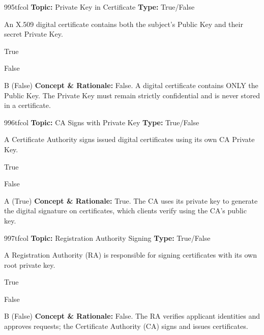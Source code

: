 \begin{qcard}{995}{tfcol}
\textcolor{darkslate!75}{\small\textbf{Topic:} Private Key in Certificate \hfill \textbf{Type:} True/False}\vspace{0.4em}\par
An X.509 digital certificate contains both the subject's Public Key and their secret Private Key.
\begin{qoptions}
\item True
\item False
\end{qoptions}
\end{qcard}
\nopagebreak
\begin{explainbox}{B (False)}
\textbf{Concept \& Rationale:} False. A digital certificate contains ONLY the Public Key. The Private Key must remain strictly confidential and is never stored in a certificate.
\end{explainbox}

\begin{qcard}{996}{tfcol}
\textcolor{darkslate!75}{\small\textbf{Topic:} CA Signs with Private Key \hfill \textbf{Type:} True/False}\vspace{0.4em}\par
A Certificate Authority signs issued digital certificates using its own CA Private Key.
\begin{qoptions}
\item True
\item False
\end{qoptions}
\end{qcard}
\nopagebreak
\begin{explainbox}{A (True)}
\textbf{Concept \& Rationale:} True. The CA uses its private key to generate the digital signature on certificates, which clients verify using the CA's public key.
\end{explainbox}

\begin{qcard}{997}{tfcol}
\textcolor{darkslate!75}{\small\textbf{Topic:} Registration Authority Signing \hfill \textbf{Type:} True/False}\vspace{0.4em}\par
A Registration Authority (RA) is responsible for signing certificates with its own root private key.
\begin{qoptions}
\item True
\item False
\end{qoptions}
\end{qcard}
\nopagebreak
\begin{explainbox}{B (False)}
\textbf{Concept \& Rationale:} False. The RA verifies applicant identities and approves requests; the Certificate Authority (CA) signs and issues certificates.
\end{explainbox}

